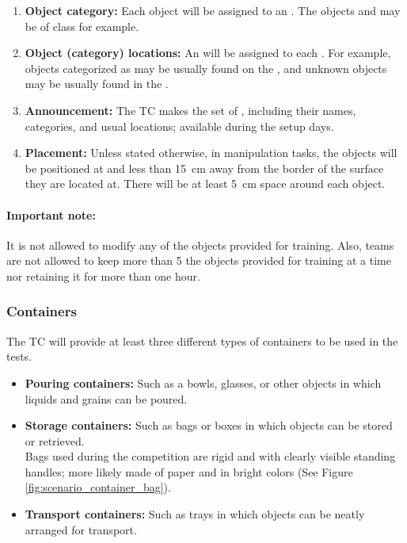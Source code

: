 \begin{enumerate}
	\item \textbf{Object category:} Each object will be assigned to an . The objects  and  may be of class  for example.

	\item \textbf{Object (category) locations:} An  will be assigned to each . For example, objects categorized as  may be usually found on the , and unknown objects  may be usually found in the .

	\item \textbf{Announcement:} The TC makes the set of , including their names, categories, and usual locations; available during the setup days. 
	
	\item \textbf{Placement:}  Unless stated otherwise, in manipulation tasks, the objects will be positioned at  and less than \SI{15}{\centi\meter} away from the border of the surface they are located at. There will be at least \SI{5}{\centi\meter} space around each object.
\end{enumerate}

\paragraph*{Important note:} It is not allowed to modify any of the objects provided for training. Also, teams are not allowed to keep more than 5 the objects provided for training at a time nor retaining it for more than one hour.

\subsubsection{Containers}
The TC will provide at least three different types of containers to be used in the tests.

\begin{itemize}
	\item \textbf{Pouring containers:} Such as a bowls, glasses, or other objects in which liquids and grains can be poured.

	\item \textbf{Storage containers:} Such as bags or boxes in which objects can be stored or retrieved.\\
	Bags used during the competition are rigid and with clearly visible standing handles; more likely made of paper and in bright colors (See Figure \ref{fig:scenario_container_bag}).

	\item \textbf{Transport containers:} Such as trays in which objects can be neatly arranged for transport.
\end{itemize}

